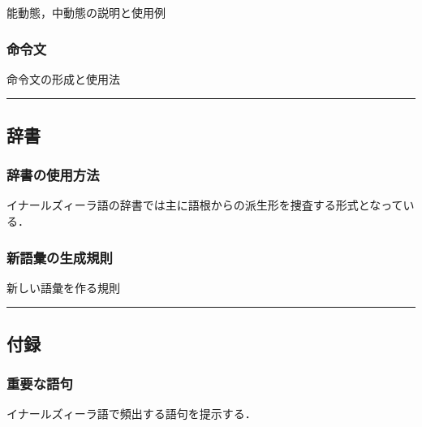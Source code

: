 \documentclass[
  japanese,
]{article}
\providecommand{\tightlist}{%
  \setlength{\itemsep}{0pt}\setlength{\parskip}{0pt}}
\begin{document}
能動態，中動態の説明と使用例

\begin{description}
\tightlist
\item[]
\end{description}

\subsubsection{命令文}\label{section7.3}

命令文の形成と使用法

\begin{description}
\tightlist
\item[]
\end{description}

\begin{center}\rule{0.5\linewidth}{0.5pt}\end{center}

\subsection{辞書}\label{chapter8}

\subsubsection{辞書の使用方法}\label{section8.1}

イナールズィーラ語の辞書では主に語根からの派生形を捜査する形式となっている．

\subsubsection{新語彙の生成規則}\label{section8.2}

新しい語彙を作る規則

\begin{center}\rule{0.5\linewidth}{0.5pt}\end{center}

\subsection{付録}\label{chapter9}

\subsubsection{重要な語句}\label{section9.1}

イナールズィーラ語で頻出する語句を提示する．
\end{document}
